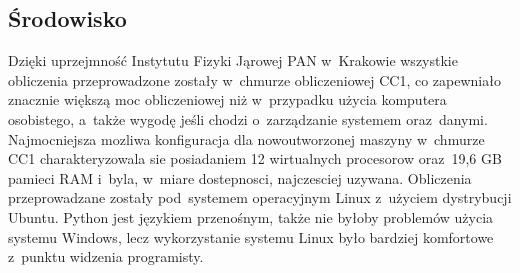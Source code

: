 \subsection{Środowisko}
Dzięki uprzejmność Instytutu Fizyki Jąrowej PAN w~Krakowie wszystkie obliczenia przeprowadzone zostały w~chmurze obliczeniowej CC1, co zapewniało znacznie większą moc obliczeniowej niż w~przypadku użycia komputera osobistego, a~także wygodę jeśli chodzi o~zarządzanie systemem oraz~danymi. Najmocniejsza mozliwa konfiguracja dla nowoutworzonej maszyny w~chmurze CC1 charakteryzowala sie posiadaniem 12 wirtualnych procesorow oraz~19,6 GB pamieci RAM i~byla, w~miare dostepnosci, najczesciej uzywana. Obliczenia przeprowadzane zostały pod~systemem operacyjnym Linux z~użyciem dystrybucji Ubuntu. Python jest językiem przenośnym, także nie byłoby problemów użycia systemu Windows, lecz wykorzystanie systemu Linux było bardziej komfortowe z~punktu widzenia programisty.

